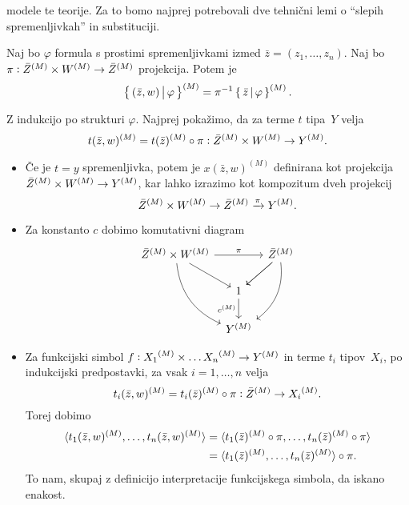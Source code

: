 \documentclass[../kategoricna_logika.tex]{subfiles}
\begin{document}
modele te teorije.  Za to bomo najprej potrebovali dve tehnični lemi o
"`slepih spremenljivkah"' in substituciji.
\begin{lema}\label{lema:slepe-spremenljivke}
  Naj bo $\varphi$ formula s prostimi spremenljivkami izmed
  $\bar{z} = (z_1, \ldots, z_n)$.  Naj bo
  $\pi : \bar{Z}^{(M)} \times W^{(M)} \to {\bar{Z}}^{(M)}$
  projekcija. Potem je
  $$\left\lbrace\,(\bar{z}, w) \,\middle|\, \varphi\,\right\rbrace^{(M)} = \pi^{-1} \left\lbrace\,\bar{z} \,\middle|\, \varphi\,\right\rbrace^{(M)}.$$
\end{lema}
\begin{dokaz}
  Z indukcijo po strukturi $\varphi$.  Najprej pokažimo, da za terme
  $t$ tipa~$Y$ velja
  $$t(\bar{z}, w)^{(M)} = t(\bar{z})^{(M)} \circ \pi : {\bar{Z}}^{(M)} \times W^{(M)} \to {Y}^{(M)}.$$
  \begin{itemize}
  \item Če je $t = y$ spremenljivka, potem je $x(\bar{z},w)^{(M)}$
    definirana kot projekcija
    ${\bar{Z}}^{(M)} \times {W}^{(M)} \to Y^{(M)}$, kar lahko
    izrazimo kot kompozitum dveh projekcij
      $${\bar{Z}}^{(M)} \times {W}^{(M)} \to \bar{Z}^{(M)} \xrightarrow{\pi} Y^{(M)}.$$

    \item Za konstanto $c$ dobimo komutativni diagram
      \begin{equation*}
        \begin{tikzcd}[column sep=tiny]
          \bar{Z}^{(M)} \times \interp{W} \ar[ddr, bend right] \ar[dr]
          \ar[rr, "\pi"] & &
          \bar{Z}^{(M)} \ar[dl] \ar[dl] \ar[ddl, bend left] \\
          & 1 \ar[d, "c^{(M)}"'] & \\
          & Y^{(M)} &
        \end{tikzcd}
      \end{equation*}
    
    \item Za funkcijski simbol
      $f : {X_1}^{(M)} \times \ldots {X_n}^{(M)} \to {Y}^{(M)}$ in
      terme $t_i$ tipov~$X_i$, po indukcijski predpostavki, za vsak
      $i = 1, \ldots, n$ velja
      \[t_i(\bar{z},w)^{(M)} = t_i(\bar{z})^{(M)} \circ \pi :
        {\bar{Z}}^{(M)} \to {X_i}^{(M)}.\] Torej dobimo
      \begin{align*}
        \langle t_1(\bar{z}, w)^{(M)}, \ldots, t_n(\bar{z}, w)^{(M)} \rangle &= \langle t_1(\bar{z})^{(M)} \circ \pi, \ldots, t_n(\bar{z})^{(M)} \circ \pi \rangle \\
                                                                     &= \langle t_1(\bar{z})^{(M)}, \ldots, t_n(\bar{z})^{(M)} \rangle \circ \pi.
      \end{align*}
      To nam, skupaj z definicijo interpretacije funkcijskega simbola,
      da iskano enakost.


\end{itemize}
\end{dokaz}
\end{document}
